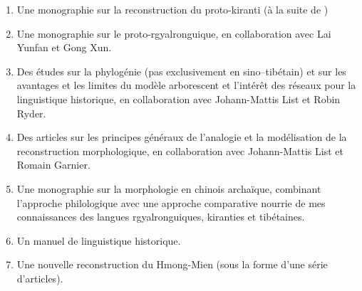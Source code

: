 \documentclass[oldfontcommands,oneside,a4paper,11pt]{article}
\begin{document}
\begin{enumerate}
\item Une monographie sur la reconstruction du proto-kiranti (à la suite de \citealt{jacques17pkiranti})
\item Une monographie sur le proto-rgyalronguique, en collaboration avec Lai Yunfan et Gong Xun.
\item Des études sur la phylogénie (pas exclusivement en sino--tibétain) et sur les avantages et les limites du modèle arborescent et l'intérêt des réseaux pour la linguistique historique, en collaboration avec Johann-Mattis List et Robin Ryder.
\item Des articles sur les principes généraux de l'analogie et la modélisation de la reconstruction morphologique, en collaboration avec Johann-Mattis List et Romain Garnier.
\item Une monographie sur la morphologie en chinois archaïque, combinant l'approche philologique avec une approche comparative nourrie de mes connaissances des langues rgyalronguiques, kiranties et tibétaines.
\item Un manuel de linguistique historique.
\item Une nouvelle reconstruction du Hmong-Mien (sous la forme d'une série d'articles).
\end{enumerate}
\end{document}
